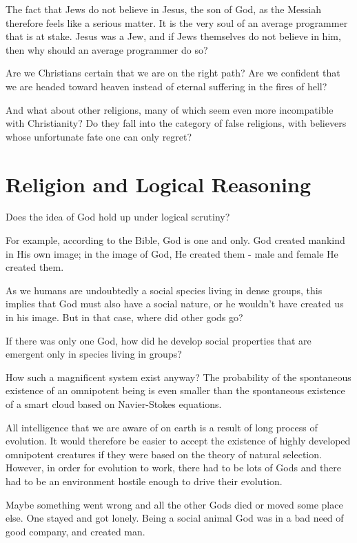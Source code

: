 The fact that Jews do not believe in Jesus, the son of God, as
the Messiah therefore feels like a serious matter. It is the very
soul of an average programmer that is at stake. Jesus was a Jew,
and if Jews themselves do not believe in him, then why should an
average programmer do so?

Are we Christians certain that we are on the right path? Are we
confident that we are headed toward heaven instead of eternal
suffering in the fires of hell?

And what about other religions, many of which seem even more
incompatible with Christianity? Do they fall into the category
of false religions, with believers whose unfortunate fate one
can only regret?


\section{Religion and Logical Reasoning}

Does the idea of God hold up under logical scrutiny?

For example, according to the Bible, God is one and only. God created mankind in His own
image; in the image of God, He created them - male and female He
created them. 

As we humans are undoubtedly a social species living in dense groups, this implies that
God must also have a social nature, or he wouldn't have created us in his image.
But in that case, where did other gods go? 

If there was only one God, how did he develop social properties that are emergent
only in species living in groups?

How such a magnificent system exist anyway? The probability of the
spontaneous existence of an omnipotent being is even smaller than
the spontaneous existence of a smart cloud based on Navier-Stokes
equations. 
  
All intelligence that we are aware of on earth is a result of
long process of evolution. It would therefore be  easier to accept 
the existence of highly  developed omnipotent creatures if they
were based on  the theory of natural selection.
However, in order for evolution to work, there had to be lots of
Gods and there had to be an environment hostile enough to  drive 
their evolution. 
  
Maybe something went wrong and all the other Gods died or moved some place else. One stayed  
and got lonely. Being a social animal God was in a bad need 
of good company, and created man. 
 
